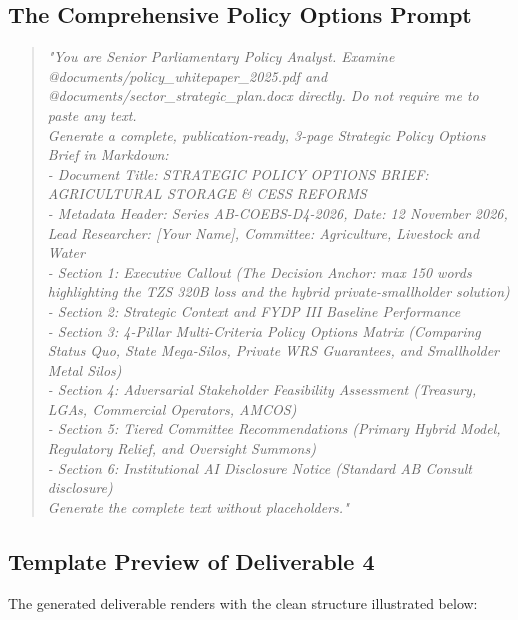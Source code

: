 \documentclass[11pt, a4paper]{report}
\begin{document}
\subsection{The Comprehensive Policy Options Prompt}
\begin{quote}
\small
\textit{"You are Senior Parliamentary Policy Analyst. Examine @documents/policy\_whitepaper\_2025.pdf and @documents/sector\_strategic\_plan.docx directly. Do not require me to paste any text. \\
Generate a complete, publication-ready, 3-page Strategic Policy Options Brief in Markdown: \\
- Document Title: STRATEGIC POLICY OPTIONS BRIEF: AGRICULTURAL STORAGE \& CESS REFORMS \\
- Metadata Header: Series AB-COEBS-D4-2026, Date: 12 November 2026, Lead Researcher: [Your Name], Committee: Agriculture, Livestock and Water \\
- Section 1: Executive Callout (The Decision Anchor: max 150 words highlighting the TZS 320B loss and the hybrid private-smallholder solution) \\
- Section 2: Strategic Context and FYDP III Baseline Performance \\
- Section 3: 4-Pillar Multi-Criteria Policy Options Matrix (Comparing Status Quo, State Mega-Silos, Private WRS Guarantees, and Smallholder Metal Silos) \\
- Section 4: Adversarial Stakeholder Feasibility Assessment (Treasury, LGAs, Commercial Operators, AMCOS) \\
- Section 5: Tiered Committee Recommendations (Primary Hybrid Model, Regulatory Relief, and Oversight Summons) \\
- Section 6: Institutional AI Disclosure Notice (Standard AB Consult disclosure) \\
Generate the complete text without placeholders."}
\end{quote}

\subsection{Template Preview of Deliverable 4}
The generated deliverable renders with the clean structure illustrated below:
\end{document}
